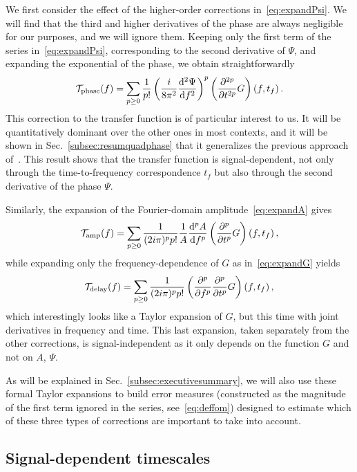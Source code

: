 \documentclass[aps,showpacs,twocolumn,
prd,superscriptaddress,nofootinbib]{revtex4-1}
\newcommand{\be}{\begin{equation}}
\newcommand{\ee}{\end{equation}}
\newcommand\ud{{\mathrm{d}}}
\newcommand\calT{{\mathcal{T}}}
\newcommand{\tf}{t_{f}}
\begin{document}
We first consider the effect of the higher-order corrections in~\eqref{eq:expandPsi}. We will find that the third and higher derivatives of the phase are always negligible for our purposes, and we will ignore them. Keeping only the first term of the series in~\eqref{eq:expandPsi}, corresponding to the second derivative of $\Psi$, and expanding the exponential of the phase, we obtain straightforwardly
\be\label{eq:resulttaylorPsi}
	\calT_{\rm phase}(f) = \sum\limits_{p\geq 0} \frac{1}{p!} \left( \frac{i}{8\pi^{2}}\frac{\ud^{2} \Psi}{\ud f^{2}} \right)^{p} \left( \frac{\partial^{2p} }{\partial t^{2p}} G \right)(f, \tf) \,.
\ee
This correction to the transfer function is of particular interest to us. It will be quantitatively dominant over the other ones in most contexts, and it will be shown in Sec.~\ref{subsec:resumquadphase} that it generalizes the previous approach of~\cite{KCY14}. This result shows that the transfer function is signal-dependent, not only through the time-to-frequency correspondence $t_{f}$ but also through the second derivative of the phase $\Psi$.

Similarly, the expansion of the Fourier-domain amplitude~\eqref{eq:expandA} gives
\be\label{eq:resulttaylorA}
	\calT_{\rm amp}(f) = \sum\limits_{p\geq 0} \frac{1}{(2i\pi)^{p}p!} \frac{1}{A} \frac{\ud^{p} A}{\ud f ^{p}}  \left( \frac{\partial^{p} }{\partial t^{p}} G \right)(f,\tf) \,,
\ee
while expanding only the frequency-dependence of $G$ as in~\eqref{eq:expandG} yields
\be\label{eq:resulttaylordelay}
	\calT_{\rm delay}(f) = \sum\limits_{p\geq 0} \frac{1}{(2i\pi)^{p}p!} \left( \frac{\partial^{p} }{\partial f^{p}} \frac{\partial^{p} }{\partial t^{p}} G \right)(f,\tf) \,,
\ee
which interestingly looks like a Taylor expansion of $G$, but this time with joint derivatives in frequency and time. This last expansion, taken separately from the other corrections, is signal-independent as it only depends on the function $G$ and not on $A$, $\Psi$.

As will be explained in Sec.~\ref{subsec:executivesummary}, we will also use these formal Taylor expansions to build error measures (constructed as the magnitude of the first term ignored in the series, see~\eqref{eq:deffom}) designed to estimate which of these three types of corrections are important to take into account.


\subsection{Signal-dependent timescales}
\label{subsec:timescales}
\end{document}
